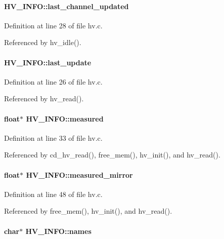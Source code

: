 \paragraph[{last\_\-channel\_\-updated}]{ {\bf HV\_\-INFO::last\_\-channel\_\-updated}}\hfill\label{structHV__INFO_a4e75f06fff4493c516a8376bdbb18465}


Definition at line 28 of file hv.c.

Referenced by hv\_\-idle().
\paragraph[{last\_\-update}]{ {\bf HV\_\-INFO::last\_\-update}}\hfill\label{structHV__INFO_a2668b8cf12fab6db3723bd974f420168}


Definition at line 26 of file hv.c.

Referenced by hv\_\-read().
\paragraph[{measured}]{\setlength{\rightskip}{0pt plus 5cm}float$\ast$ {\bf HV\_\-INFO::measured}}\hfill\label{structHV__INFO_a13349cbb396a9eb7bc736c33f42b2288}


Definition at line 33 of file hv.c.

Referenced by cd\_\-hv\_\-read(), free\_\-mem(), hv\_\-init(), and hv\_\-read().
\paragraph[{measured\_\-mirror}]{\setlength{\rightskip}{0pt plus 5cm}float$\ast$ {\bf HV\_\-INFO::measured\_\-mirror}}\hfill\label{structHV__INFO_a2e8b64d058496b0316464c89f7bacaa4}


Definition at line 48 of file hv.c.

Referenced by free\_\-mem(), hv\_\-init(), and hv\_\-read().
\paragraph[{names}]{\setlength{\rightskip}{0pt plus 5cm}char$\ast$ {\bf HV\_\-INFO::names}}\hfill\label{structHV__INFO_abb11a3d3bd69af64d9fef6b3bfa4a89c}


